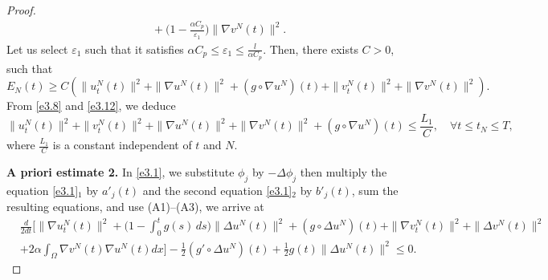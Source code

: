\begin{proof}
\begin{equation}
\begin{aligned}
 &\quad +\Big( 1-\frac{\alpha C_p}{\varepsilon_{1}}\Big) \| \nabla v^N(t) \|^2.
\end{aligned}\label{e3.13}
\end{equation}
Let us select $\varepsilon_{1}$ such that it satisfies
$\alpha C_p \leq \varepsilon_{1}\leq \frac{l}{\alpha C_p}$.
Then, there exists $C>0$, such that
\begin{equation}
E_N(t)\geq C\left( \| u^N_{t}(t) \|^2 + \| \nabla u^N (t)\|^2
+(g\circ\nabla u^N)(t)+\| v^N_{t}(t) \|^2 + \| \nabla v^N (t)\|^2\right).\label{e3.14}
\end{equation}
From \eqref{e3.8} and \eqref{e3.12}, we deduce
\begin{equation}
\| u^N_{t}(t) \|^2 +\| v^N_{t}(t) \|^2 + \| \nabla u^N(t) \|^2
+ \| \nabla v^N (t)\|^2 +(g\circ\nabla u^N)(t)\leq \frac{L_{1}}{C},\quad
\forall t\leq t_{N}\leq T,
\label{e3.15}
\end{equation}
where $\frac{L_{1}}{C}$ is a constant independent of $t$ and $N$.
\smallskip

\noindent\textbf{A priori estimate 2.}
In \eqref{e3.1}, we substitute $\phi_j $ by $ -\Delta \phi_j$ then
multiply the equation \eqref{e3.1}$_1$ by $a'_j(t)$ and the second equation
\eqref{e3.1}$_2$ by $b'_j(t)$, sum the resulting equations, and use
(A1)--(A3), we arrive at
\begin{align*}
&\frac{d}{2dt}\Big[ \| \nabla u^N_{t}(t) \|^2
+\Big( 1 - \int_0^t g(s)\,ds \Big) \| \Delta u^N(t) \|^2
+ (g \circ \Delta u^N)(t) + \| \nabla v^N_{t}(t) \|^2
+ \| \Delta v^N(t) \|^2 \\
& +2 \alpha \int_{\Omega} \nabla v^N(t) \nabla u^N(t) dx\Big]
-\frac{1}{2} \left( g' \circ \Delta u^N \right)(t)
+\frac{1}{2} g(t) \| \Delta u^N(t) \|^2\leq 0.
\end{align*}


\end{proof}
